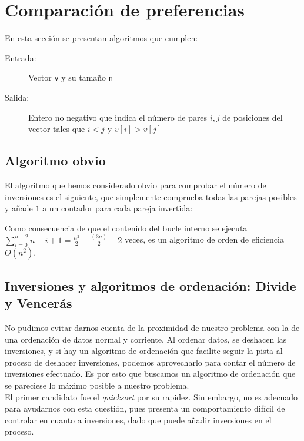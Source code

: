 \section{Comparación de preferencias}

En esta sección se presentan algoritmos que cumplen:
\begin{description}
	\item[Entrada:] Vector \texttt{v} y su tamaño \texttt{n}
	\item[Salida:] Entero no negativo que indica el número de pares $i,j$ de posiciones del vector tales que $i < j$ y $v[i] > v[j]$
\end{description}

\subsection{Algoritmo obvio}

El algoritmo que hemos considerado obvio para comprobar el número de inversiones es el siguiente, que simplemente comprueba todas las parejas posibles y añade $1$ a un contador para cada pareja invertida:



Como consecuencia de que el contenido del bucle interno se ejecuta $\displaystyle \sum_{i=0}^{n-2} n-i+1 = \frac{n^2}{2}+\frac{(3n)}{2}-2 $ veces, es un algoritmo de orden de eficiencia $O(n^2)$.

\subsection{Inversiones y algoritmos de ordenación: Divide y Vencerás}

No pudimos evitar darnos cuenta de la proximidad de nuestro problema con la de una ordenación de datos normal y corriente. Al ordenar datos, se deshacen las inversiones, y si hay un algoritmo de ordenación que facilite seguir la pista al proceso de deshacer inversiones, podemos aprovecharlo para contar el número de inversiones efectuado.
Es por esto que buscamos un algoritmo de ordenación que se pareciese lo máximo posible a nuestro problema. \\

El primer candidato fue el \textit{quicksort} por su rapidez. Sin embargo, no es adecuado para ayudarnos con esta cuestión, pues presenta un comportamiento difícil de controlar en cuanto a inversiones, dado que puede añadir inversiones en el proceso. \\ 

